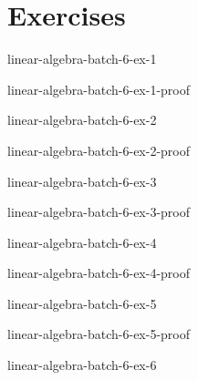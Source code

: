 \documentclass[preview]{standalone}
\begin{document}
\genpage

\section{Exercises}

\begin{snippetexercise}{linear-algebra-batch-6-ex-1}{}
    \todo
\end{snippetexercise}

\begin{snippetsolution}{linear-algebra-batch-6-ex-1-proof}{}
    \todo
\end{snippetsolution}

\begin{snippetexercise}{linear-algebra-batch-6-ex-2}{}
    \todo
\end{snippetexercise}

\begin{snippetsolution}{linear-algebra-batch-6-ex-2-proof}{}
    \todo
\end{snippetsolution}

\begin{snippetexercise}{linear-algebra-batch-6-ex-3}{}
    \todo
\end{snippetexercise}

\begin{snippetsolution}{linear-algebra-batch-6-ex-3-proof}{}
    \todo
\end{snippetsolution}

\begin{snippetexercise}{linear-algebra-batch-6-ex-4}{}
    \todo
\end{snippetexercise}

\begin{snippetsolution}{linear-algebra-batch-6-ex-4-proof}{}
    \todo
\end{snippetsolution}

\begin{snippetexercise}{linear-algebra-batch-6-ex-5}{}
    \todo
\end{snippetexercise}

\begin{snippetsolution}{linear-algebra-batch-6-ex-5-proof}{}
    \todo
\end{snippetsolution}

\begin{snippetexercise}{linear-algebra-batch-6-ex-6}{}
    \todo
\end{snippetexercise}
\end{document}
